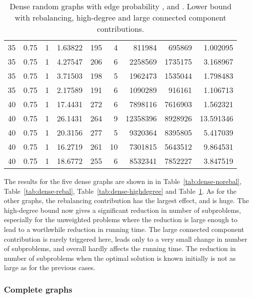 \documentclass[a4paper,11pt]{article}
\begin{document}
\begin{table}
\begin{center}
\begin{tabular}{|rrr|r|r|rrr|r|}
35 & 0.75 & 1 & 1.63822 & 195 & 4 & 811984 & 695869 & 1.002095 \\
35 & 0.75 & 1 & 4.27547 & 206 & 6 & 2258569 & 1735175 & 3.168967 \\
35 & 0.75 & 1 & 3.71503 & 198 & 5 & 1962473 & 1535044 & 1.798483 \\
35 & 0.75 & 1 & 2.17589 & 191 & 6 & 1090289 & 916161 & 1.106713 \\
40 & 0.75 & 1 & 17.4431 & 272 & 6 & 7898116 & 7616903 & 1.562321 \\
40 & 0.75 & 1 & 26.1431 & 264 & 9 & 12358396 & 8928926 & 13.591346 \\
40 & 0.75 & 1 & 20.3156 & 277 & 5 & 9320364 & 8395805 & 5.417039 \\
40 & 0.75 & 1 & 16.2719 & 261 & 10 & 7301815 & 5643512 & 9.864531 \\
40 & 0.75 & 1 & 18.6772 & 255 & 6 & 8532341 & 7852227 & 3.847519 \\
\hline
\end{tabular}
\end{center}
\caption{Dense random graphs with edge probability ,
   and . Lower bound with rebalancing,
  high-degree and large connected component contributions.}
\label{tab:dense-all}
\end{table}

The results for the five dense graphs are shown in in
Table~\ref{tab:dense-norebal}, Table~\ref{tab:dense-rebal},
Table~\ref{tab:dense-highdegree} and Table~\ref{tab:dense-all}.  As
for the other graphs, the rebalancing contribution has the largest
effect, and is huge. The high-degree bound now gives a significant
reduction in number of subproblems, especially for the unweighted
problems where the reduction is large enough to lead to a worthwhile
reduction in running time. The large connected component contribution
is rarely triggered here, leads only to a very small change
in number of subproblems, and overall hardly affects the running time.
The reduction in number of subproblems when the optimal solution is
known initially is not as large as for the previous cases.

\subsubsection{Complete  graphs}
\end{document}
